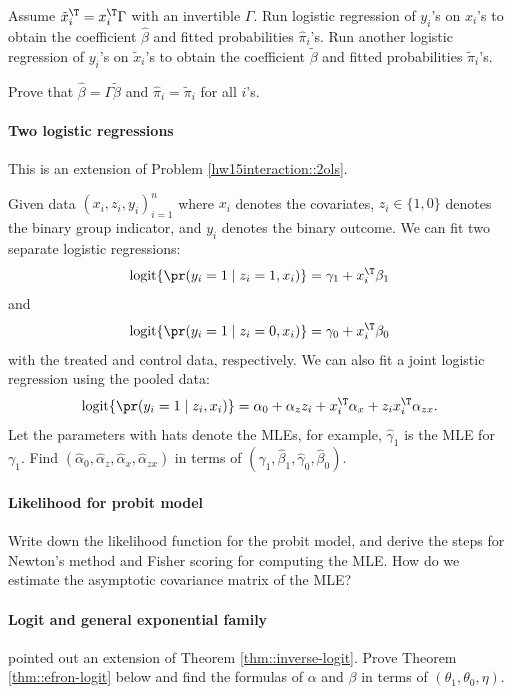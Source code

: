 Assume $\tilde{x}_i^{\T} = x_i^{\T} \Gamma$ with an invertible $\Gamma$. Run logistic regression of $y_i$'s on $x_i$'s to obtain the coefficient $\hat\beta$ and fitted probabilities $\hat\pi_i$'s. Run another logistic regression of $y_i$'s on $\tilde x_i$'s to obtain the coefficient $\tilde \beta$ and fitted probabilities $\tilde\pi_i$'s.

Prove that $\hat\beta = \Gamma \tilde \beta$ and $\hat\pi_i = \tilde\pi_i$ for all $i$'s. 


 


\paragraph{Two logistic regressions}\label{hw17::2logistic}

This is an extension of Problem \ref{hw15interaction::2ols}. 

Given data $(x_i, z_i, y_i)_{i=1}^n$ where $x_i$ denotes the covariates, $z_i \in \{1,0 \}$ denotes the binary group indicator, and $y_i$ denotes the binary outcome. We can fit two separate logistic regressions:
$$
\text{logit}\{  \pr(y_i=1\mid z_i =1, x_i) \}=  \gamma_1 + x_i^{\T} \beta_1
$$
and
$$
\text{logit}\{  \pr(y_i=1\mid z_i =0, x_i) \}=  \gamma_0 + x_i^{\T} \beta_0
$$
with the treated and control data, respectively. We can also fit a joint logistic regression using the pooled data:
$$
\text{logit}\{  \pr(y_i=1\mid z_i , x_i) \} = \alpha_0 + \alpha_z z_i + x_i^{\T} \alpha_x  +  z_i x_i^{\T} \alpha_{zx}.
$$
Let the parameters with hats denote the MLEs, for example, $\hat{\gamma}_1$ is the MLE for $\gamma_1$. Find $(\hat{\alpha}_0, \hat{\alpha}_z, \hat{\alpha}_x, \hat{\alpha}_{zx})$ in terms of $ (  \hat{\gamma}_1, \hat{\beta}_1, \hat{\gamma}_0, \hat{\beta}_0 ).$

 

\paragraph{Likelihood for probit model}\label{hw17::probit-mle}

Write down the likelihood function for the probit model, and derive the steps for Newton's method and Fisher scoring for computing the MLE. How do we estimate the asymptotic covariance matrix of the MLE?



 

\paragraph{Logit and general exponential family}\label{hw17::logit-lda-exponential}
\citet{efron1975efficiency} pointed out an extension of Theorem \ref{thm::inverse-logit}. Prove Theorem \ref{thm::efron-logit} below and find the formulas of $ \alpha $ and $\beta$ in terms of $(\theta_1,\theta_0,\eta)$. 


